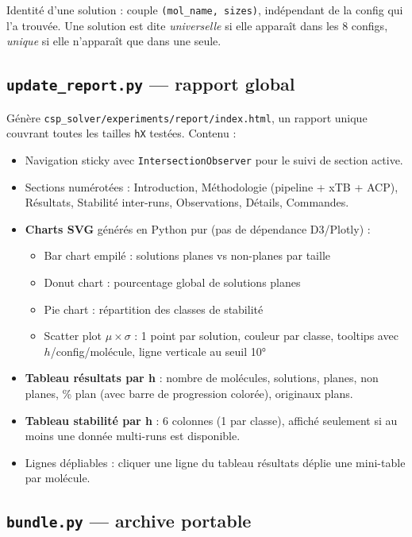 \documentclass[12pt,a4paper]{article}
\theoremstyle{definition}
\begin{document}
Identité d'une solution : couple \texttt{(mol\_name, sizes)}, indépendant de la config qui
l'a trouvée. Une solution est dite \emph{universelle} si elle apparaît dans les 8 configs,
\emph{unique} si elle n'apparaît que dans une seule.

\subsection{\texttt{update\_report.py} — rapport global}

Génère \texttt{csp\_solver/experiments/report/index.html}, un rapport unique couvrant toutes
les tailles \texttt{hX} testées. Contenu :

\begin{itemize}
  \item Navigation sticky avec \texttt{IntersectionObserver} pour le suivi de section active.
  \item Sections numérotées : Introduction, Méthodologie (pipeline + xTB + ACP), Résultats,
    Stabilité inter-runs, Observations, Détails, Commandes.
  \item \textbf{Charts SVG} générés en Python pur (pas de dépendance D3/Plotly) :
    \begin{itemize}
      \item Bar chart empilé : solutions planes vs non-planes par taille
      \item Donut chart : pourcentage global de solutions planes
      \item Pie chart : répartition des classes de stabilité
      \item Scatter plot $\mu \times \sigma$ : 1 point par solution, couleur par classe,
        tooltips avec $h$/config/molécule, ligne verticale au seuil 10°
    \end{itemize}
  \item \textbf{Tableau résultats par h} : nombre de molécules, solutions, planes, non
    planes, \% plan (avec barre de progression colorée), originaux plans.
  \item \textbf{Tableau stabilité par h} : 6 colonnes (1 par classe), affiché seulement si
    au moins une donnée multi-runs est disponible.
  \item Lignes dépliables : cliquer une ligne du tableau résultats déplie une mini-table par
    molécule.
\end{itemize}

\subsection{\texttt{bundle.py} — archive portable}
\end{document}
